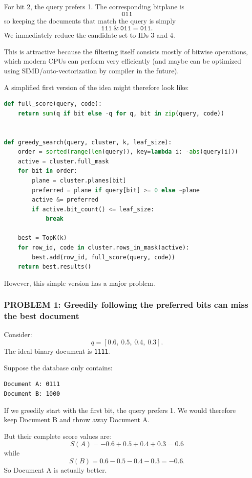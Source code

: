 For bit 2, the query prefers 1. The corresponding bitplane is
\[
\texttt{011}
\]
so keeping the documents that match the query is simply
\[
\texttt{111}\ \&\ \texttt{011}=\texttt{011}.
\]
We immediately reduce the candidate set to IDs 3 and 4.

This is attractive because the filtering itself consists mostly of bitwise operations,
which modern CPUs can perform very efficiently (and maybe can be optimized using SIMD/auto-vectorization by compiler in the future).

A simplified first version of the idea might therefore look like:

\begin{minipage}{\linewidth}
\begin{lstlisting}[language=Python]
def full_score(query, code):
    return sum(q if bit else -q for q, bit in zip(query, code))


def greedy_search(query, cluster, k, leaf_size):
    order = sorted(range(len(query)), key=lambda i: -abs(query[i]))
    active = cluster.full_mask
    for bit in order:
        plane = cluster.planes[bit]
        preferred = plane if query[bit] >= 0 else ~plane
        active &= preferred
        if active.bit_count() <= leaf_size:
            break

    best = TopK(k)
    for row_id, code in cluster.rows_in_mask(active):
        best.add(row_id, full_score(query, code))
    return best.results()
\end{lstlisting}
\end{minipage}

However, this simple version has a major problem.

\subsubsection*{PROBLEM 1: Greedily following the preferred bits can miss the best document}
Consider:
\[
q=[0.6,\ 0.5,\ 0.4,\ 0.3].
\]
The ideal binary document is \texttt{1111}.

Suppose the database only contains:
\begin{verbatim}
Document A: 0111
Document B: 1000
\end{verbatim}
If we greedily start with the first bit, the query prefers 1. We would therefore keep
Document B and throw away Document A.

But their complete score values are:
\[
S(A)=-0.6+0.5+0.4+0.3=0.6
\]
while
\[
S(B)=0.6-0.5-0.4-0.3=-0.6.
\]
So Document A is actually better.

